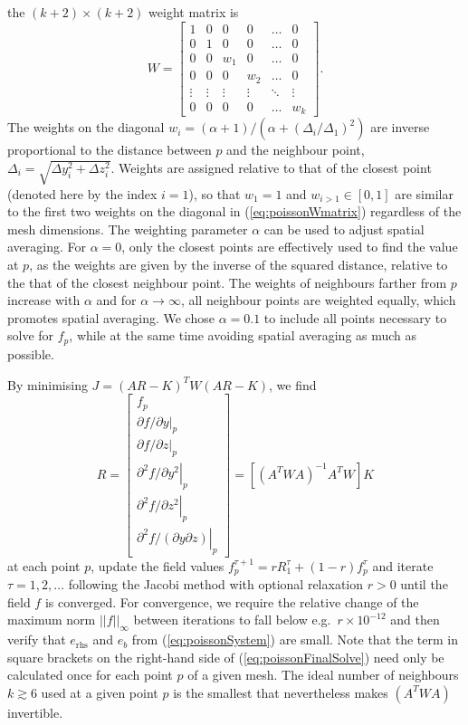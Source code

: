 \documentclass{article}
\begin{document}
the $(k+2) \times (k+2)$ weight matrix is
\begin{equation} \label{eq:poissonWmatrix}
W=
\begin{bmatrix}
1 & 0 & 0   & 0   & \hdots & 0 \\
0 & 1 & 0   & 0   & \hdots & 0 \\
0 & 0 & w_1 & 0   & \hdots & 0 \\
0 & 0 & 0   & w_2 & \hdots & 0 \\
\vdots & \vdots & \vdots   & \vdots   & \ddots & \vdots \\
0 & 0 & 0   & 0   & \hdots & w_k
\end{bmatrix}.
\end{equation}
The weights on the diagonal
$w_i= (\alpha+1)/ \left( \alpha + (\Delta_i/\Delta_1)^2 \right)$ are inverse proportional to the 
distance between $p$ and the neighbour point, $\Delta_i = \sqrt{\Delta y_i^2 + \Delta z_i^2}$.
Weights are assigned relative to that of the closest point (denoted here by the index $i=1$), so that $w_1=1$ and $w_{i>1} \in [0,1]$ are similar to the first two weights on the diagonal in (\ref{eq:poissonWmatrix}) 
regardless of the mesh dimensions.
The weighting parameter $\alpha$ can be used to adjust spatial averaging.
For $\alpha = 0$, only the closest points are effectively used to find the value at $p$,
as the weights are given by the inverse of the squared distance, relative to the that of the closest neighbour point.
The weights of neighbours farther from $p$ increase with $\alpha$ and for $\alpha \rightarrow \infty$, all neighbour points are weighted equally, which promotes spatial averaging.
We chose $\alpha=0.1$ to include all points necessary to solve for $f_p$, while at the same time avoiding spatial averaging as much as possible. 


By minimising $J=(AR-K)^T W (AR-K)$, we find
\begin{equation} \label{eq:poissonFinalSolve}
R=
\begin{bmatrix}
f_p \\ 
\left. \partial f/\partial y     \right|_p  \\ 
\left. \partial f/\partial z     \right|_p  \\ 
\left. \partial ^2f/\partial y^2 \right|_p  \\ 
\left. \partial ^2f/\partial z^2 \right|_p  \\
\left. \partial ^2f/(\partial y\partial z) \right|_p 
\end{bmatrix}
=
\left[ \left( A^T W A\right)^{-1} A^T W \right] K 
\end{equation}
at each point $p$, 
update the field values $f_p^{\tau+1}=rR_1^\tau + (1-r)f_p^\tau$ and iterate $\tau = 1,2,\ldots$ 
following the Jacobi method
with optional relaxation $r>0$
until the field $f$ is converged.
For convergence, we require the relative change of the maximum norm $||f||_\infty$ between iterations to fall below e.g.\ $r \times 10^{-12}$ and then verify that $e_\mathrm{rhs}$ and $e_b$ from (\ref{eq:poissonSystem}) are small.
Note that the term in square brackets on the right-hand side of (\ref{eq:poissonFinalSolve}) need only be calculated once for each point $p$ of a given mesh.
The ideal number of neighbours $k \gtrsim 6$ used at a given point $p$ is the smallest that nevertheless makes $\left( A^T W A\right)$ invertible.
\end{document}
